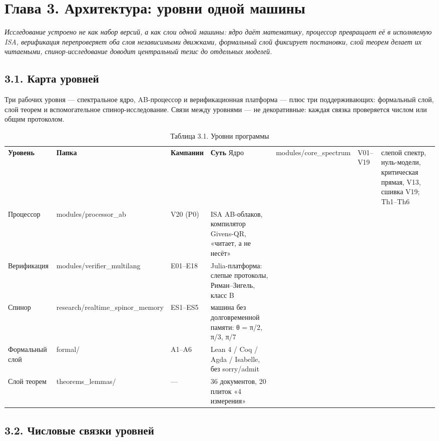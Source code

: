\documentclass[11pt,a4paper]{article}
\begin{document}
\section{Глава 3. Архитектура: уровни одной машины}

\noindent\textit{\color{copper}Исследование устроено не как набор версий, а как слои одной машины: ядро даёт математику, процессор превращает её в исполняемую ISA, верификация перепроверяет оба слоя независимыми движками, формальный слой фиксирует постановки, слой теорем делает их читаемыми, спинор-исследование доводит центральный тезис до отдельных моделей.}

\subsection{3.1. Карта уровней}

Три рабочих уровня — спектральное ядро, AB-процессор и верификационная платформа — плюс три поддерживающих: формальный слой, слой теорем и вспомогательное спинор-исследование. Связи между уровнями — не декоративные: каждая связка проверяется числом или общим протоколом.

\begin{table}[htbp]\centering\small
\caption{Таблица 3.1. Уровни программы}
\begin{tabular}{p{} p{} p{} p{}}
\toprule
\textbf{Уровень} & \textbf{Папка} & \textbf{Кампании} & \textbf{Суть}
\midrule
Ядро & modules/core\_spectrum & V01–V19 & слепой спектр, нуль-модели, критическая прямая, V13, сшивка V19; Th1–Th6 \\
Процессор & modules/processor\_ab & V20 (P0) & ISA AB-облаков, компилятор Givens-QR, «читает, а не несёт» \\
Верификация & modules/verifier\_multilang & E01–E18 & Julia-платформа: слепые протоколы, Риман–Зигель, класс B \\
Спинор & research/realtime\_spinor\_memory & ES1–ES5 & машина без долговременной памяти: θ = π/2, π/3, π/7 \\
Формальный слой & formal/ & A1–A6 & Lean 4 / Coq / Agda / Isabelle, без sorry/admit \\
Слой теорем & theorems\_lemmas/ & — & 36 документов, 20 плиток «4 измерения» \\
\bottomrule
\end{tabular}
\end{table}

\subsection{3.2. Числовые связки уровней}
\end{document}
